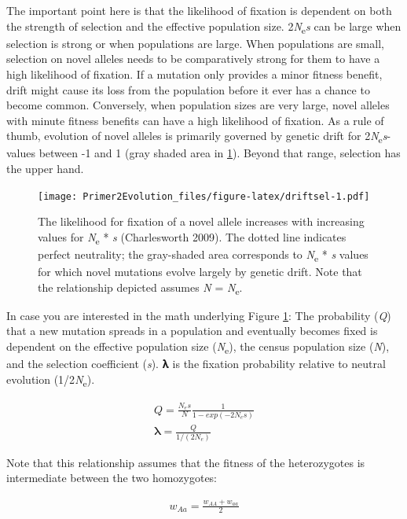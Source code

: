 \documentclass[
]{book}
\begin{document}
The important point here is that the likelihood of fixation is dependent on both the strength of selection and the effective population size. 2\emph{N}\textsubscript{e}\emph{s} can be large when selection is strong or when populations are large. When populations are small, selection on novel alleles needs to be comparatively strong for them to have a high likelihood of fixation. If a mutation only provides a minor fitness benefit, drift might cause its loss from the population before it ever has a chance to become common. Conversely, when population sizes are very large, novel alleles with minute fitness benefits can have a high likelihood of fixation. As a rule of thumb, evolution of novel alleles is primarily governed by genetic drift for 2\emph{N}\textsubscript{e}\emph{s}-values between -1 and 1 (gray shaded area in \ref{fig:driftsel}). Beyond that range, selection has the upper hand.

\begin{figure}
\centering
\texttt{[image: Primer2Evolution\_files/figure-latex/driftsel-1.pdf]}
\caption{\label{fig:driftsel}The likelihood for fixation of a novel allele increases with increasing values for \emph{N}\textsubscript{e} * \emph{s} (Charlesworth 2009). The dotted line indicates perfect neutrality; the gray-shaded area corresponds to \emph{N}\textsubscript{e} * \emph{s} values for which novel mutations evolve largely by genetic drift. Note that the relationship depicted assumes \emph{N} = \emph{N}\textsubscript{e}.}
\end{figure}

In case you are interested in the math underlying Figure \ref{fig:driftsel}: The probability (\emph{Q}) that a new mutation spreads in a population and eventually becomes fixed is dependent on the effective population size (\emph{N}\textsubscript{e}), the census population size (\emph{N}), and the selection coefficient (\emph{s}). 𝛌 is the fixation probability relative to neutral evolution (1/2\emph{N}\textsubscript{e}).

\begin{align} 
Q = \frac{N_es}{N} \frac{1}{1-exp(-2N_es)} \label{eq:25} \\
𝛌 = \frac{Q}{1/(2N_e)} \label{eq:26}
\end{align}

Note that this relationship assumes that the fitness of the heterozygotes is intermediate between the two homozygotes:

\begin{align} 
w_{Aa} = \frac{w_{AA}+w_{aa}}{2} \label{eq:27}
\end{align}
\end{document}
